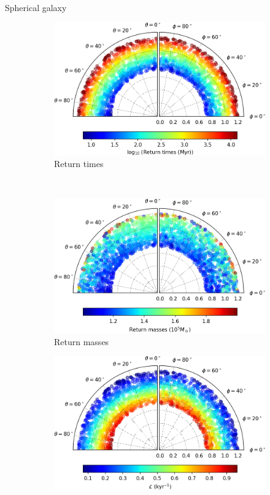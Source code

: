 \documentclass{beamer}
\begin{document}
\begin{frame}{Spherical galaxy}
	\begin{figure}[h]
		\centering
		\begin{subfigure}[t]{0.35\textwidth}
			\includegraphics[width = \textwidth]{"../Files/Week 13/images/10_time"}
			\caption{Return times}
		\end{subfigure}
		~ 
		\begin{subfigure}[t]{0.35\textwidth}
			\includegraphics[width=\textwidth]{"../Files/Week 13/images/10_mass"}
			\caption{Return masses}
		\end{subfigure}
		\begin{subfigure}[t]{0.35\textwidth}
			\includegraphics[width=\textwidth]{"../Files/Week 13/images/10_lyapunov"}

\end{subfigure}
\end{figure}
\end{frame}
\end{document}
